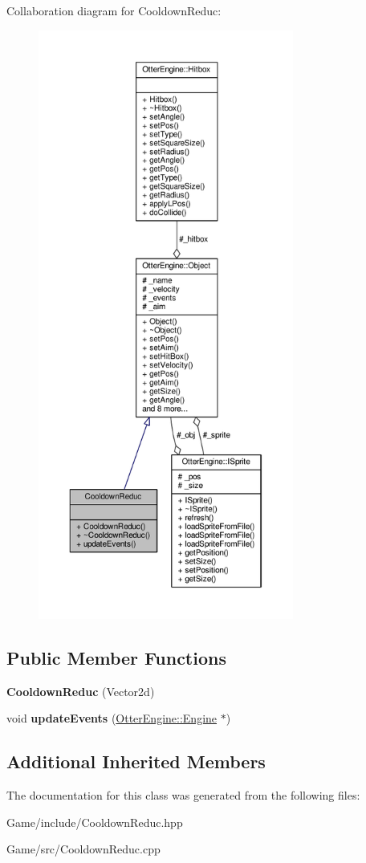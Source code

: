 Collaboration diagram for Cooldown\+Reduc\+:\nopagebreak
\begin{figure}[H]
\begin{center}
\leavevmode
\includegraphics[height=550pt]{dd/dff/class_cooldown_reduc__coll__graph}
\end{center}
\end{figure}
\subsection*{Public Member Functions}
\begin{DoxyCompactItemize}
\item 
{\bfseries Cooldown\+Reduc} (Vector2d)\hypertarget{class_cooldown_reduc_a5f6e093172fcd8cacddd0da0aaf6d2bb}{}\label{class_cooldown_reduc_a5f6e093172fcd8cacddd0da0aaf6d2bb}

\item 
void {\bfseries update\+Events} (\hyperlink{class_otter_engine_1_1_engine}{Otter\+Engine\+::\+Engine} $\ast$)\hypertarget{class_cooldown_reduc_a8cc74e0abeee8fb16522126290ba4068}{}\label{class_cooldown_reduc_a8cc74e0abeee8fb16522126290ba4068}

\end{DoxyCompactItemize}
\subsection*{Additional Inherited Members}


The documentation for this class was generated from the following files\+:\begin{DoxyCompactItemize}
\item 
Game/include/Cooldown\+Reduc.\+hpp\item 
Game/src/Cooldown\+Reduc.\+cpp\end{DoxyCompactItemize}
